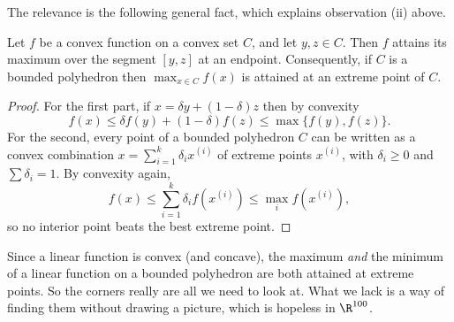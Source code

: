 \begin{center}
\end{center}

The relevance is the following general fact, which explains observation (ii) above.

\begin{proposition}
    Let $f$ be a convex function on a convex set $C$, and let $y, z \in C$. Then $f$ attains its maximum over the segment $[y,z]$ at an endpoint. Consequently, if $C$ is a bounded polyhedron then $\max_{x \in C}f(x)$ is attained at an extreme point of $C$.
\end{proposition}
\begin{proof}
    For the first part, if $x = \delta y + (1-\delta)z$ then by convexity
    $$
    f(x) \leq \delta f(y) + (1 - \delta)f(z) \leq \max\{f(y), f(z)\}.
    $$
    For the second, every point of a bounded polyhedron $C$ can be written as a convex combination $x = \sum_{i=1}^k \delta_i x^{(i)}$ of extreme points $x^{(i)}$, with $\delta_i \geq 0$ and $\sum\delta_i = 1$. By convexity again,
    $$
    f(x) \leq \sum_{i = 1}^k \delta_i f(x^{(i)}) \leq \max_i f(x^{(i)}),
    $$
    so no interior point beats the best extreme point.
\end{proof}

Since a linear function is convex (and concave), the maximum \emph{and} the minimum of a linear function on a bounded polyhedron are both attained at extreme points. So the corners really are all we need to look at. What we lack is a way of finding them without drawing a picture, which is hopeless in $\R^{100}$.


